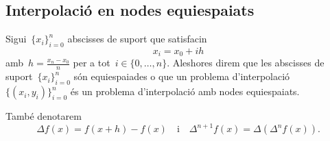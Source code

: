 \documentclass[../../main.tex]{subfiles}
\begin{document}
    \subsection{Interpolació en nodes equiespaiats}
    \begin{definition}
        \label{def:nodes equiespaiats}
        Sigui~\(\{x_{i}\}_{i=0}^{n}\) abscisses de suport que satisfacin
        \[
            x_{i}=x_{0}+ih
        \]
        amb~\(h=\frac{x_{n}-x_{0}}{n}\) per a tot~\(i\in\{0,\dots,n\}\).
        Aleshores direm que les abscisses de suport~\(\{x_{i}\}_{i=0}^{n}\) són equiespaiades o que un problema d'interpolació~\(\{(x_{i},y_{i})\}_{i=0}^{n}\) és un problema d'interpolació amb nodes equiespaiats.

        També denotarem
        \[
            \Delta f(x)=f(x+h)-f(x)\quad\text{i}\quad\Delta^{n+1}f(x)=\Delta(\Delta^{n}f(x)).
        \]
    \end{definition}
\end{document}
